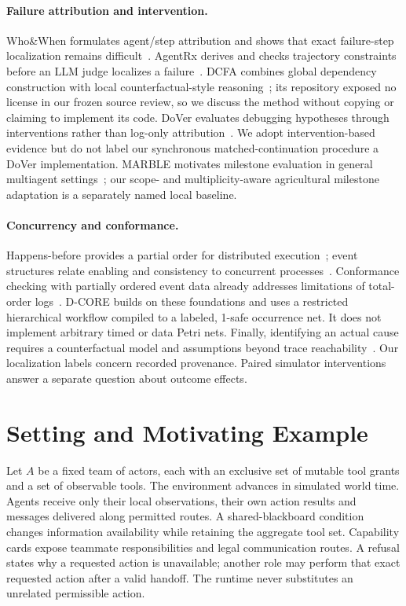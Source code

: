 \documentclass[sigconf,anonymous]{aamas}
\begin{document}
\paragraph{Failure attribution and intervention.}
Who\&When formulates agent/step attribution and shows that exact failure-step localization remains difficult~\cite{whowhen}. AgentRx derives and checks trajectory constraints before an LLM judge localizes a failure~\cite{agentrx}. DCFA combines global dependency construction with local counterfactual-style reasoning~\cite{dcfa}; its repository exposed no license in our frozen source review, so we discuss the method without copying or claiming to implement its code. DoVer evaluates debugging hypotheses through interventions rather than log-only attribution~\cite{dover}. We adopt intervention-based evidence but do not label our synchronous matched-continuation procedure a DoVer implementation. MARBLE motivates milestone evaluation in general multiagent settings~\cite{multiagentbench}; our scope- and multiplicity-aware agricultural milestone adaptation is a separately named local baseline.

\paragraph{Concurrency and conformance.}
Happens-before provides a partial order for distributed execution~\cite{lamport}; event structures relate enabling and consistency to concurrent processes~\cite{winskel}. Conformance checking with partially ordered event data already addresses limitations of total-order logs~\cite{partialorder}. D-CORE builds on these foundations and uses a restricted hierarchical workflow compiled to a labeled, 1-safe occurrence net. It does not implement arbitrary timed or data Petri nets. Finally, identifying an actual cause requires a counterfactual model and assumptions beyond trace reachability~\cite{halpern}. Our localization labels concern recorded provenance. Paired simulator interventions answer a separate question about outcome effects.

\section{Setting and Motivating Example}
Let $A$ be a fixed team of actors, each with an exclusive set of mutable tool grants and a set of observable tools. The environment advances in simulated world time. Agents receive only their local observations, their own action results and messages delivered along permitted routes. A shared-blackboard condition changes information availability while retaining the aggregate tool set. Capability cards expose teammate responsibilities and legal communication routes. A refusal states why a requested action is unavailable; another role may perform that exact requested action after a valid handoff. The runtime never substitutes an unrelated permissible action.
\end{document}
